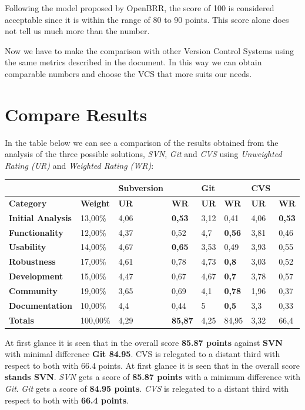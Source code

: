 \documentclass[11pt]{scrartcl}
\begin{document}
\par Following the model proposed by OpenBRR, the score of 100 is considered acceptable since it is within the range of 80 to 90 points. This score alone does not tell us much more than the number.

\par Now we have to make the comparison with other Version Control Systems using the same metrics described in the document. In this way we can obtain comparable numbers and choose the VCS that more suits our needs.

\section{Compare Results}

In the table below we can see a comparison of the results obtained from the analysis of the three possible solutions, \emph{SVN}, \emph{Git} and \emph{CVS} using \emph{Unweighted Rating (UR)} and \emph{Weighted Rating (WR)}:

\begin{tabular}{|l|l|l|l|l|l|l|l|}
    \hline
     &  & {\bf Subversion} &   & {\bf Git} &  & {\bf CVS} &  \\
    \hline
    {\bf Category} & {\bf Weight} & {\bf UR} & {\bf WR} & {\bf UR} & {\bf WR} & {\bf UR} & {\bf WR}\\
    \hline
    {\bf Initial Analysis} & 13,00\% & 4,06 & {\bf 0,53} & 3,12 & 0,41 & 4,06 & {\bf 0,53}\\
    \hline
    {\bf Functionality} & 12,00\% & 4,37 & 0,52 & 4,7 & {\bf 0,56} & 3,81 & 0,46\\
    \hline
    {\bf Usability} & 14,00\% & 4,67 & {\bf 0,65} & 3,53 & 0,49 & 3,93 & 0,55\\
    \hline
    {\bf Robustness} & 17,00\% & 4,61 & 0,78 & 4,73 & {\bf 0,8} & 3,03 & 0,52\\
    \hline
    {\bf Development} & 15,00\% & 4,47 & 0,67 & 4,67 & {\bf 0,7} & 3,78 & 0,57\\
    \hline
    {\bf Community} & 19,00\% & 3,65 & 0,69 & 4,1 & {\bf 0,78} & 1,96 & 0,37\\
    \hline
    {\bf Documentation} & 10,00\% & 4,4 & 0,44 & 5 & {\bf 0,5} & 3,3 & 0,33\\
    \hline
    {\bf Totals} & 100,00\% & 4,29 & {\bf 85,87} & 4,25 & 84,95 & 3,32 & 66,4\\
    \hline
\end{tabular}

\par At first glance it is seen that in the overall score \textbf{85.87 points} against \textbf{SVN} with minimal difference \textbf{Git 84.95}. CVS is relegated to a distant third with respect to both with 66.4 points.
At first glance it is seen that in the overall score \textbf{stands SVN}. \emph{SVN} gets a score of \textbf{85.87 points} with a minimum difference with \emph{Git}. \emph{Git} gets a score of \textbf{84.95 points}. \emph{CVS} is relegated to a distant third with respect to both with \textbf{66.4 points}.
\end{document}

